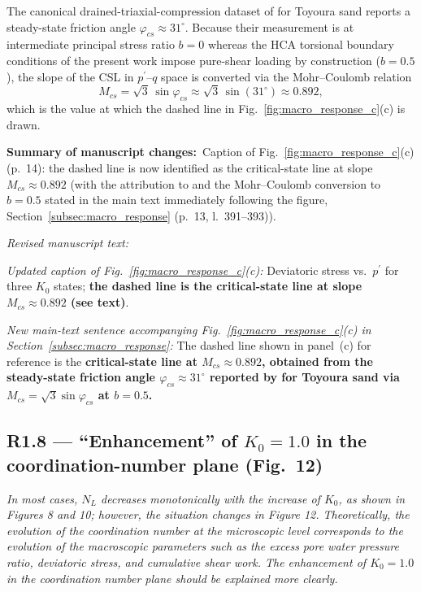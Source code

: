 \documentclass[11pt,a4paper]{article}
\newenvironment{rcomment}
  {\begin{leftbar}\color{black!75}\itshape}
  {\end{leftbar}\vspace{0.3em}}
\newcommand{\changed}[1]{\par\noindent\textbf{Summary of manuscript changes:}\ #1\par}
\newenvironment{revtext}
  {\par\vspace{0.2em}\noindent\textit{Revised manuscript text:}\par
   \begingroup\color{black}\begin{leftbar}\small}
  {\end{leftbar}\endgroup\vspace{0.3em}}
\newcommand{\manref}[1]{(#1)}                  %
\newcommand{\Kzero}{\ensuremath{K_0}}
\begin{document}
The canonical drained-triaxial-compression dataset of
\citet{VerdugoIshihara1996} for Toyoura sand reports a steady-state
friction angle $\varphi_{cs}\approx 31^{\circ}$. Because their
measurement is at intermediate principal stress ratio $b=0$ whereas
the HCA torsional boundary conditions of the present work impose
pure-shear loading by construction ($b=0.5$), the slope of the CSL
in $p^{\prime}$--$q$ space is converted via the Mohr--Coulomb
relation
\[
  M_{cs} = \sqrt{3}\,\sin\varphi_{cs}
  \approx \sqrt{3}\,\sin(31^{\circ})
  \approx 0.892,
\]
which is the value at which the dashed line in
Fig.~\ref{fig:macro_response_c}(c) is drawn.

\changed{Caption of Fig.~\ref{fig:macro_response_c}(c)
\manref{p.~14}: the dashed line is now identified as the
critical-state line at slope $M_{cs}\approx 0.892$ (with the
attribution to \citet{VerdugoIshihara1996} and the Mohr--Coulomb
conversion to $b=0.5$ stated in the main text immediately
following the figure, Section~\ref{subsec:macro_response}
\manref{p.~13, l.~391--393}).}

\begin{revtext}
\textit{Updated caption of Fig.~\ref{fig:macro_response_c}(c):}
Deviatoric stress vs.\ $p^{\prime}$ for three \Kzero{} states;
\textbf{the dashed line is the critical-state line at slope
$M_{cs}\approx 0.892$ (see text)}.

\medskip

\textit{New main-text sentence accompanying
Fig.~\ref{fig:macro_response_c}(c) in
Section~\ref{subsec:macro_response}:}
The dashed line shown in panel~(c) for reference is the
\textbf{critical-state line at $M_{cs}\approx 0.892$, obtained
from the steady-state friction angle
$\varphi_{cs}\approx 31^{\circ}$ reported by
\citet{VerdugoIshihara1996} for Toyoura sand via
$M_{cs}=\sqrt{3}\sin\varphi_{cs}$ at $b=0.5$.}
\end{revtext}

\subsection*{R1.8 --- ``Enhancement'' of $\Kzero = 1.0$ in the coordination-number plane (Fig.~12)}

\begin{rcomment}
In most cases, $N_L$ decreases monotonically with the increase of $\Kzero$,
as shown in Figures 8 and 10; however, the situation changes in Figure 12.
Theoretically, the evolution of the coordination number at the microscopic
level corresponds to the evolution of the macroscopic parameters such as the
excess pore water pressure ratio, deviatoric stress, and cumulative shear
work. The enhancement of $\Kzero = 1.0$ in the coordination number plane
should be explained more clearly.
\end{rcomment}
\end{document}

